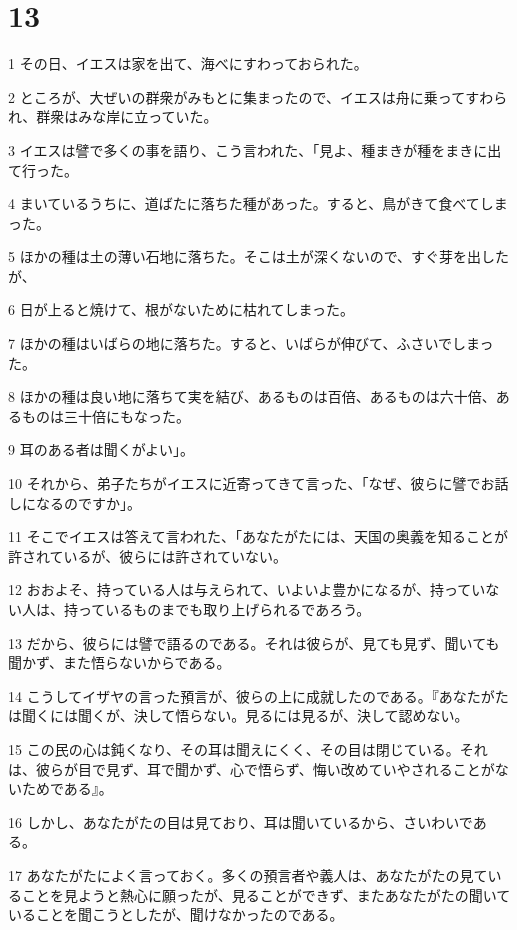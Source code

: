 \chapter{13}

\par 1 その日、イエスは家を出て、海べにすわっておられた。
\par 2 ところが、大ぜいの群衆がみもとに集まったので、イエスは舟に乗ってすわられ、群衆はみな岸に立っていた。
\par 3 イエスは譬で多くの事を語り、こう言われた、「見よ、種まきが種をまきに出て行った。
\par 4 まいているうちに、道ばたに落ちた種があった。すると、鳥がきて食べてしまった。
\par 5 ほかの種は土の薄い石地に落ちた。そこは土が深くないので、すぐ芽を出したが、
\par 6 日が上ると焼けて、根がないために枯れてしまった。
\par 7 ほかの種はいばらの地に落ちた。すると、いばらが伸びて、ふさいでしまった。
\par 8 ほかの種は良い地に落ちて実を結び、あるものは百倍、あるものは六十倍、あるものは三十倍にもなった。
\par 9 耳のある者は聞くがよい」。
\par 10 それから、弟子たちがイエスに近寄ってきて言った、「なぜ、彼らに譬でお話しになるのですか」。
\par 11 そこでイエスは答えて言われた、「あなたがたには、天国の奥義を知ることが許されているが、彼らには許されていない。
\par 12 おおよそ、持っている人は与えられて、いよいよ豊かになるが、持っていない人は、持っているものまでも取り上げられるであろう。
\par 13 だから、彼らには譬で語るのである。それは彼らが、見ても見ず、聞いても聞かず、また悟らないからである。
\par 14 こうしてイザヤの言った預言が、彼らの上に成就したのである。『あなたがたは聞くには聞くが、決して悟らない。見るには見るが、決して認めない。
\par 15 この民の心は鈍くなり、その耳は聞えにくく、その目は閉じている。それは、彼らが目で見ず、耳で聞かず、心で悟らず、悔い改めていやされることがないためである』。
\par 16 しかし、あなたがたの目は見ており、耳は聞いているから、さいわいである。
\par 17 あなたがたによく言っておく。多くの預言者や義人は、あなたがたの見ていることを見ようと熱心に願ったが、見ることができず、またあなたがたの聞いていることを聞こうとしたが、聞けなかったのである。
